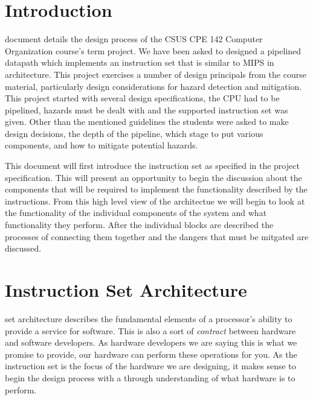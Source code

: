 
\usepackage{tabularx}
\usepackage{pdfpages}
\usepackage{lipsum}
\usepackage{pdfpages}

\renewcommand{\arraystretch}{1.3}

\newcommand{\COURSE}{CPE142: Computer Organization}
\newcommand{\TITLE}{Term Project: Phase Two}
\newcommand{\DUEDATE}{December Fourth 2014}
\newcommand{\ABSTRACT}{\textit{A pipelined CPU is designed to implement a subset of the MIPS instruction set...}}






\newpage

\newpage

\section{Introduction}
 document details the design process of the CSUS CPE 142 Computer Organization 
course's term project. We have been asked to designed a pipelined datapath which implements an instruction 
set that is similar to MIPS in architecture. This project exercises a number of design principals from
the course material, particularly design considerations for hazard detection and mitigation. This
project started with several design specifications, the CPU had to be pipelined, hazards must be dealt
with and the supported instruction set was given. Other than the mentioned guidelines the students were
asked to make design decisions, the depth of the pipeline, which stage to put various components, and how
to mitigate potential hazards.

This document will first introduce the instruction set as specified in the project specification. This will 
present an opportunity to begin the discussion about the components that will be required to implement the
functionality described by the instructions. From this high level view of the architectue we will begin to
look at the functionality of the individual components of the system and what functionality they perform. 
After the individual blocks are described the processes of connecting them together and the dangers that
must be mitgated are discussed. 

\section{Instruction Set Architecture}
 set architecture describes the fundamental elements of a processor's ability
to provide a service for software. This is also a sort of \textit{contract} between hardware and software
developers. As hardware developers we are saying this is what we promise to provide, our hardware can perform
these operations for you. As the instruction set is the focus of the hardware we are designing, it makes sense to
begin the design process with a through understanding of what hardware is to perform.

